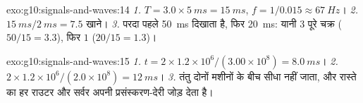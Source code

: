 \begin{solution}{exo:g10:signals-and-waves:14}
\emph{1.} $T = 3.0 \times \qty{5}{ms} = \qty{15}{ms}$, $f = 1/0.015 \approx \qty{67}{Hz}$।
\emph{2.} $\qty{15}{ms}/\qty{2}{ms} = 7.5$ खाने।
\emph{3.} परदा पहले \qty{50}{ms} दिखाता है, फिर \qty{20}{ms}: यानी $3$ पूरे चक्र
($50/15 = 3.3$), फिर $1$ ($20/15 = 1.3$)।
\end{solution}

\begin{solution}{exo:g10:signals-and-waves:15}
\emph{1.} $t = 2 \times 1.2\times10^{6}/(3.00\times10^{8}) =
\qty{8.0}{ms}$।
\emph{2.} $2 \times 1.2\times10^{6}/(2.0\times10^{8}) = \qty{12}{ms}$।
\emph{3.} तंतु दोनों मशीनों के बीच सीधा नहीं जाता, और रास्ते का हर
राउटर और सर्वर अपनी प्रसंस्करण-देरी जोड़ देता है।
\end{solution}

